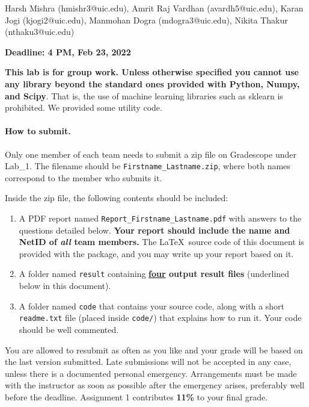 \documentclass[11pt]{report}
\begin{document}
\maketitle
Harsh Mishra (hmishr3@uic.edu), Amrit Raj Vardhan (avardh5@uic.edu), Karan Jogi (kjogi2@uic.edu), Manmohan Dogra (mdogra3@uic.edu), Nikita Thakur (nthaku3@uic.edu)

{\bf Deadline: 4 PM, Feb 23, 2022}


{\bf This lab is for group work.
Unless otherwise specified you cannot use any library beyond the standard ones provided with Python, Numpy, and Scipy}.
That is, the use of machine learning libraries such as sklearn is prohibited.
We provided some utility code.



\paragraph{How to submit.}

Only one member of each team needs to submit a zip file on Gradescope under Lab\_1.
The filename should be \verb#Firstname_Lastname.zip#,
where both names correspond to the member who submits it.

Inside the zip file, the following contents should be included:
\begin{enumerate}
	\item  A PDF report named \verb#Report_Firstname_Lastname.pdf# with answers to the questions detailed below.
	{\bf Your report should include the name and NetID of \emph{all} team members.}
	The \LaTeX\ source code of this document is provided with the package, and you may write up your report based on it.
	\item A folder named \verb#result# containing {\bf \underline{four} output result files} (underlined below in this document).
	\item A folder named \verb#code# that contains your source code, along with a short \verb#readme.txt# file (placed inside \verb#code/#) that explains how to run it.
		Your code should be well commented.
\end{enumerate}



You are allowed to resubmit as often as you like and your grade will be based on the last version submitted.
Late submissions will not be accepted in any case, 
unless there is a documented personal emergency.  
Arrangements must be made with the instructor as soon as possible after the emergency arises,
preferably well before the deadline.
Assignment 1 contributes {\bf 11\%} to your final grade.
\end{document}
